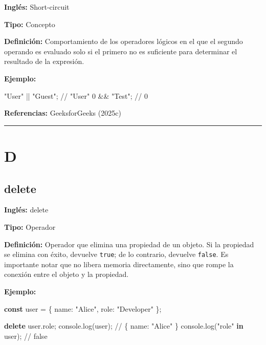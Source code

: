 \documentclass[
  letterpaper,
  DIV=11,
  numbers=noendperiod]{scrreprt}
\newenvironment{Shaded}{\begin{snugshade}}{\end{snugshade}}
\newcommand{\AttributeTok}[1]{\textcolor[rgb]{0.40,0.45,0.13}{#1}}
\newcommand{\BuiltInTok}[1]{\textcolor[rgb]{0.00,0.23,0.31}{#1}}
\newcommand{\CommentTok}[1]{\textcolor[rgb]{0.37,0.37,0.37}{#1}}
\newcommand{\DataTypeTok}[1]{\textcolor[rgb]{0.68,0.00,0.00}{#1}}
\newcommand{\DecValTok}[1]{\textcolor[rgb]{0.68,0.00,0.00}{#1}}
\newcommand{\FunctionTok}[1]{\textcolor[rgb]{0.28,0.35,0.67}{#1}}
\newcommand{\KeywordTok}[1]{\textcolor[rgb]{0.00,0.23,0.31}{\textbf{#1}}}
\newcommand{\NormalTok}[1]{\textcolor[rgb]{0.00,0.23,0.31}{#1}}
\newcommand{\OperatorTok}[1]{\textcolor[rgb]{0.37,0.37,0.37}{#1}}
\newcommand{\StringTok}[1]{\textcolor[rgb]{0.13,0.47,0.30}{#1}}
\let\oldsubsection\subsection
\renewcommand{\subsection}{\phantomsection\oldsubsection}
\begin{document}
\textbf{Inglés:} Short-circuit

\textbf{Tipo:} Concepto

\textbf{Definición:} Comportamiento de los operadores lógicos en el que
el segundo operando es evaluado solo si el primero no es suficiente para
determinar el resultado de la expresión.

\textbf{Ejemplo:}

\begin{Shaded}
\begin{Highlighting}[]
\StringTok{"User"} \OperatorTok{||} \StringTok{"Guest"}\OperatorTok{;} \CommentTok{// "User"}
\DecValTok{0} \OperatorTok{\&\&} \StringTok{"Test"}\OperatorTok{;} \CommentTok{// 0}
\end{Highlighting}
\end{Shaded}

\textbf{Referencias:} GeeksforGeeks (2025c)

\begin{center}\rule{0.5\linewidth}{0.5pt}\end{center}

\section*{D}\label{d}


\subsection*{delete}\label{glos-delete}

\textbf{Inglés:} delete

\textbf{Tipo:} Operador

\textbf{Definición:} Operador que elimina una propiedad de un objeto. Si
la propiedad se elimina con éxito, devuelve \texttt{true}; de lo
contrario, devuelve \texttt{false}. Es importante notar que no libera
memoria directamente, sino que rompe la conexión entre el objeto y la
propiedad.

\textbf{Ejemplo:}

\begin{Shaded}
\begin{Highlighting}[]
\KeywordTok{const}\NormalTok{ user }\OperatorTok{=}\NormalTok{ \{ }\DataTypeTok{name}\OperatorTok{:} \StringTok{"Alice"}\OperatorTok{,} \DataTypeTok{role}\OperatorTok{:} \StringTok{"Developer"}\NormalTok{ \}}\OperatorTok{;}

\KeywordTok{delete}\NormalTok{ user}\OperatorTok{.}\AttributeTok{role}\OperatorTok{;}
\BuiltInTok{console}\OperatorTok{.}\FunctionTok{log}\NormalTok{(user)}\OperatorTok{;} \CommentTok{// \{ name: "Alice" \}}
\BuiltInTok{console}\OperatorTok{.}\FunctionTok{log}\NormalTok{(}\StringTok{"role"} \KeywordTok{in}\NormalTok{ user)}\OperatorTok{;} \CommentTok{// false}
\end{Highlighting}
\end{Shaded}
\end{document}
